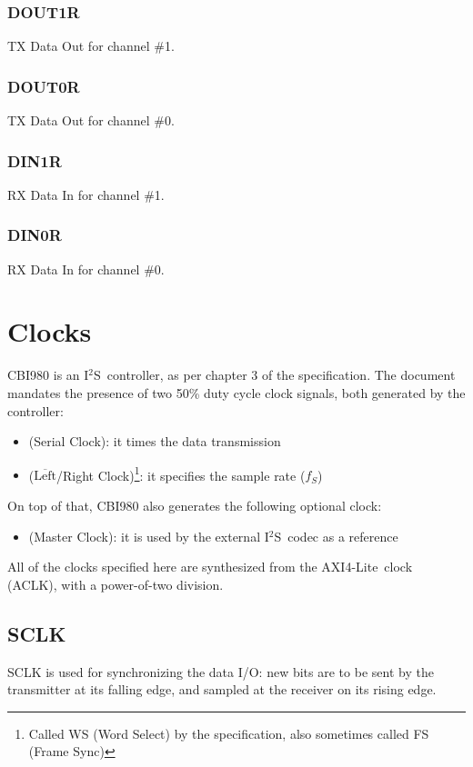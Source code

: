 \documentclass{datasheet}
\newcommand{\iis}{I$^2$S}
\newcommand{\al}{AXI4-Lite}
\newcommand{\textoverline}[1]{$\overline{\mbox{#1}}$}
\begin{document}
	\subsubsection{DOUT1R}\label{sec:reg:dout1r}
	TX Data Out for channel \#1.

	\subsubsection{DOUT0R}\label{sec:reg:dout0r}
	TX Data Out for channel \#0.

	\subsubsection{DIN1R}\label{sec:reg:din1r}
	RX Data In for channel \#1.

	\subsubsection{DIN0R}\label{sec:reg:din0r}
	RX Data In for channel \#0.

	\section{Clocks}\label{sec:clk}
	CBI980 is an \iis\ controller, as per chapter 3 of the specification\cite{i2s-spec}. The document mandates the presence of two 50\% duty cycle clock signals, both generated by the controller:
	\begin{itemize}
		\item {} (Serial Clock): it times the data transmission
		\item {} (\textoverline{Left}/Right Clock)\footnote{Called WS (Word Select) by the specification, also sometimes called FS (Frame Sync)}: it specifies the sample rate ($f_S$)
	\end{itemize}
	On top of that, CBI980 also generates the following optional clock:
	\begin{itemize}
		\item {} (Master Clock): it is used by the external \iis\ codec as a reference
	\end{itemize}

	All of the clocks specified here are synthesized from the \al\ clock (ACLK), with a power-of-two division.

	\subsection{SCLK}\label{sec:clk:sclk}
	SCLK is used for synchronizing the data I/O: new bits are to be sent by the transmitter at its falling edge, and sampled at the receiver on its rising edge.
\end{document}
